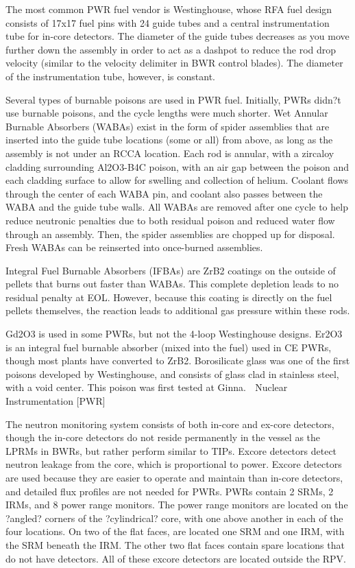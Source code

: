 \documentclass[10pt]{article}
\begin{document}
The most common PWR fuel vendor is Westinghouse, whose RFA fuel design consists of 17x17 fuel pins with 24 guide tubes and a central instrumentation tube for in-core detectors. The diameter of the guide tubes decreases as you move further down the assembly in order to act as a dashpot to reduce the rod drop velocity (similar to the velocity delimiter in BWR control blades). The diameter of the instrumentation tube, however, is constant. 

Several types of burnable poisons are used in PWR fuel. Initially, PWRs didn?t use burnable poisons, and the cycle lengths were much shorter. Wet Annular Burnable Absorbers (WABAs) exist in the form of spider assemblies that are inserted into the guide tube locations (some or all) from above, as long as the assembly is not under an RCCA location. Each rod is annular, with a zircaloy cladding surrounding Al2O3-B4C poison, with an air gap between the poison and each cladding surface to allow for swelling and collection of helium. Coolant flows through the center of each WABA pin, and coolant also passes between the WABA and the guide tube walls. All WABAs are removed after one cycle to help reduce neutronic penalties due to both residual poison and reduced water flow through an assembly. Then, the spider assemblies are chopped up for disposal. Fresh WABAs can be reinserted into once-burned assemblies. 

Integral Fuel Burnable Absorbers (IFBAs) are ZrB2 coatings on the outside of pellets that burns out faster than WABAs. This complete depletion leads to no residual penalty at EOL. However, because this coating is directly on the fuel pellets themselves, the  reaction leads to additional gas pressure within these rods. 

Gd2O3 is used in some PWRs, but not the 4-loop Westinghouse designs. Er2O3 is an integral fuel burnable absorber (mixed into the fuel) used in CE PWRs, though most plants have converted to ZrB2. Borosilicate glass was one of the first poisons developed by Westinghouse, and consists of glass clad in stainless steel, with a void center. This poison was first tested at Ginna. 

Nuclear Instrumentation [PWR]

The neutron monitoring system consists of both in-core and ex-core detectors, though the in-core detectors do not reside permanently in the vessel as the LPRMs in BWRs, but rather perform similar to TIPs. Excore detectors detect neutron leakage from the core, which is proportional to power. Excore detectors are used because they are easier to operate and maintain than in-core detectors, and detailed flux profiles are not needed for PWRs. PWRs contain 2 SRMs, 2 IRMs, and 8 power range monitors. The power range monitors are located on the ?angled? corners of the ?cylindrical? core, with one above another in each of the four locations. On two of the flat faces, are located one SRM and one IRM, with the SRM beneath the IRM. The other two flat faces contain spare locations that do not have detectors. All of these excore detectors are located outside the RPV. 
\end{document}
